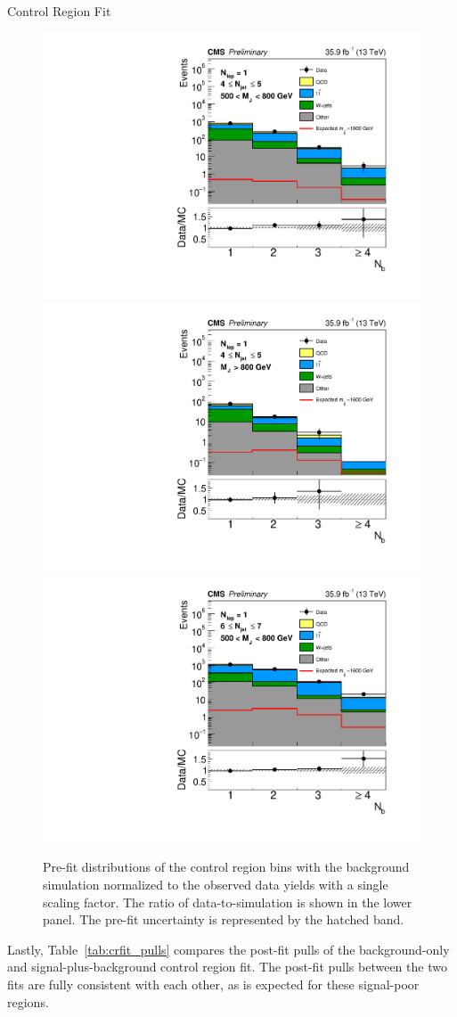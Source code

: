 \begin{subsection}{Control Region Fit}
\begin{figure}[tbp!]
\begin{center}
\includegraphics[angle=0,width=0.45\columnwidth]{fig/prefit_nlep1_nj45_lowmj.pdf}
\includegraphics[angle=0,width=0.45\columnwidth]{fig/prefit_nlep1_nj45_highmj.pdf}
\includegraphics[angle=0,width=0.45\columnwidth]{fig/prefit_nlep1_nj67_lowmj.pdf}
\end{center}
\caption{Pre-fit \Nb distributions of the control region bins with the background simulation normalized to the observed data yields with a single scaling factor.
The ratio of data-to-simulation is shown in the lower panel.
The pre-fit uncertainty is represented by the hatched band.}
\label{fig:prefit_cr}
\end{figure}

Lastly, Table~\ref{tab:crfit_pulls} compares the post-fit pulls of the background-only and signal-plus-background control region fit.
The post-fit pulls between the two fits are fully consistent with each other, as is expected for these signal-poor regions.


\end{subsection}
